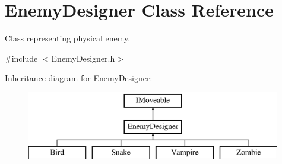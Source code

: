 \hypertarget{class_enemy_designer}{}\section{Enemy\+Designer Class Reference}
\label{class_enemy_designer}


Class representing physical enemy.  




{\ttfamily \#include $<$Enemy\+Designer.\+h$>$}

Inheritance diagram for Enemy\+Designer\+:\begin{figure}[H]
\begin{center}
\leavevmode
\includegraphics[height=3.000000cm]{class_enemy_designer}
\end{center}
\end{figure}
